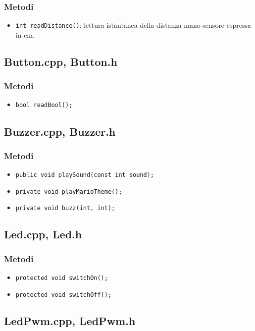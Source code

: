 \subsubsection{Metodi}
\begin{itemize}
	\item \texttt{int readDistance()}: lettura istantanea della distanza mano-sensore espressa in cm.
\end{itemize}

\subsection{Button.cpp, Button.h}
\subsubsection{Metodi}
\begin{itemize}
	\item \texttt{bool readBool();}
\end{itemize}

\subsection{Buzzer.cpp, Buzzer.h}
\subsubsection{Metodi}
\begin{itemize}
	\item \texttt{public void playSound(const int sound);}
	\item \texttt{private void playMarioTheme();}
	\item \texttt{private void buzz(int, int);}
\end{itemize}

\subsection{Led.cpp, Led.h}
\subsubsection{Metodi}
\begin{itemize}
	\item \texttt{protected	void switchOn();}
	\item \texttt{protected	void switchOff();}
\end{itemize}

\subsection{LedPwm.cpp, LedPwm.h}
